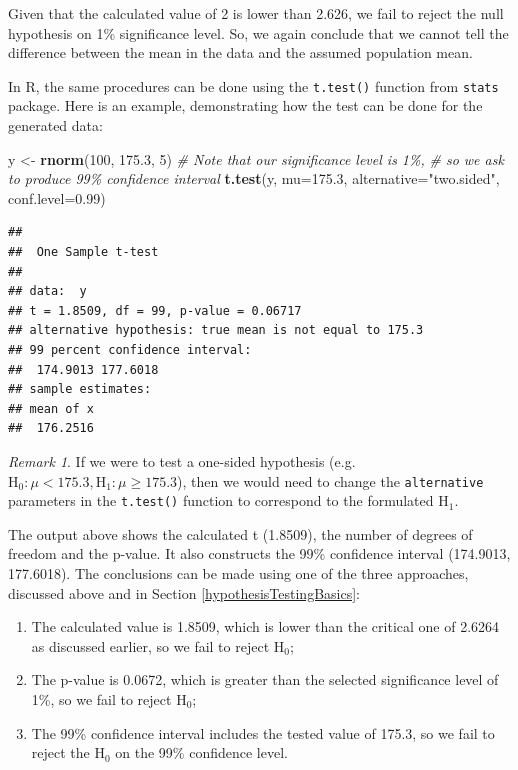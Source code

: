 \documentclass[
]{book}
\newenvironment{Shaded}{\begin{snugshade}}{\end{snugshade}}
\newcommand{\CommentTok}[1]{\textcolor[rgb]{0.56,0.35,0.01}{\textit{#1}}}
\newcommand{\DataTypeTok}[1]{\textcolor[rgb]{0.13,0.29,0.53}{#1}}
\newcommand{\DecValTok}[1]{\textcolor[rgb]{0.00,0.00,0.81}{#1}}
\newcommand{\FloatTok}[1]{\textcolor[rgb]{0.00,0.00,0.81}{#1}}
\newcommand{\KeywordTok}[1]{\textcolor[rgb]{0.13,0.29,0.53}{\textbf{#1}}}
\newcommand{\NormalTok}[1]{#1}
\newcommand{\StringTok}[1]{\textcolor[rgb]{0.31,0.60,0.02}{#1}}
\providecommand{\tightlist}{%
  \setlength{\itemsep}{0pt}\setlength{\parskip}{0pt}}
\theoremstyle{definition}
\theoremstyle{definition}
\theoremstyle{definition}
\theoremstyle{definition}
\theoremstyle{remark}
\newtheorem*{remark}{Remark}
\begin{document}
Given that the calculated value of 2 is lower than 2.626, we fail to reject the null hypothesis on 1\% significance level. So, we again conclude that we cannot tell the difference between the mean in the data and the assumed population mean.

In R, the same procedures can be done using the \texttt{t.test()} function from \texttt{stats} package. Here is an example, demonstrating how the test can be done for the generated data:

\begin{Shaded}
\begin{Highlighting}[]
\NormalTok{y \textless{}{-}}\StringTok{ }\KeywordTok{rnorm}\NormalTok{(}\DecValTok{100}\NormalTok{, }\FloatTok{175.3}\NormalTok{, }\DecValTok{5}\NormalTok{)}
\CommentTok{\# Note that our significance level is 1\%,}
\CommentTok{\# so we ask to produce 99\% confidence interval}
\KeywordTok{t.test}\NormalTok{(y, }\DataTypeTok{mu=}\FloatTok{175.3}\NormalTok{, }\DataTypeTok{alternative=}\StringTok{"two.sided"}\NormalTok{, }\DataTypeTok{conf.level=}\FloatTok{0.99}\NormalTok{)}
\end{Highlighting}
\end{Shaded}

\begin{verbatim}
## 
##  One Sample t-test
## 
## data:  y
## t = 1.8509, df = 99, p-value = 0.06717
## alternative hypothesis: true mean is not equal to 175.3
## 99 percent confidence interval:
##  174.9013 177.6018
## sample estimates:
## mean of x 
##  176.2516
\end{verbatim}

\begin{remark}
If we were to test a one-sided hypothesis (e.g.~\(\mathrm{H}_0: \mu < 175.3, \mathrm{H}_1: \mu \geq 175.3\)), then we would need to change the \texttt{alternative} parameters in the \texttt{t.test()} function to correspond to the formulated H\(_1\).
\end{remark}

The output above shows the calculated t (1.8509), the number of degrees of freedom and the p-value. It also constructs the 99\% confidence interval (174.9013, 177.6018). The conclusions can be made using one of the three approaches, discussed above and in Section \ref{hypothesisTestingBasics}:

\begin{enumerate}
\def\labelenumi{\arabic{enumi}.}
\tightlist
\item
  The calculated value is 1.8509, which is lower than the critical one of 2.6264 as discussed earlier, so we fail to reject H\(_0\);
\item
  The p-value is 0.0672, which is greater than the selected significance level of 1\%, so we fail to reject H\(_0\);
\item
  The 99\% confidence interval includes the tested value of 175.3, so we fail to reject the H\(_0\) on the 99\% confidence level.
\end{enumerate}
\end{document}
